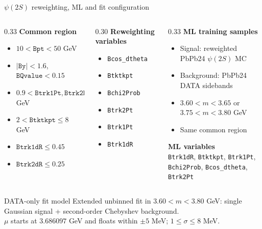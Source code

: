 \documentclass[11pt,aspectratio=169]{beamer}
\begin{document}
\begin{frame}[label=p4]{$\psi(2S)$ reweighting, ML and fit configuration}
  \footnotesize
  \begin{columns}[T,onlytextwidth]
    \begin{column}{0.33\textwidth}
      \textbf{Common region}
      \begin{itemize}
        \setlength{\itemsep}{0.08em}
        \item $10<\texttt{Bpt}<50$ GeV
        \item $|\texttt{By}|<1.6$, $\texttt{BQvalue}<0.15$
        \item $0.9<\texttt{Btrk1Pt},\texttt{Btrk2Pt}\leq4.5$ GeV
        \item $2<\texttt{Btktkpt}\leq8$ GeV
        \item $\texttt{Btrk1dR}\leq0.45$
        \item $\texttt{Btrk2dR}\leq0.25$
      \end{itemize}
    \end{column}
    \begin{column}{0.30\textwidth}
      \textbf{Reweighting variables}
      \begin{itemize}
        \setlength{\itemsep}{0.08em}
        \item \texttt{Bcos\_dtheta}
        \item \texttt{Btktkpt}
        \item \texttt{Bchi2Prob}
        \item \texttt{Btrk2Pt}
        \item \texttt{Btrk1Pt}
        \item \texttt{Btrk1dR}
      \end{itemize}
    \end{column}
    \begin{column}{0.33\textwidth}
      \textbf{ML training samples}
      \begin{itemize}
        \setlength{\itemsep}{0.08em}
        \item Signal: reweighted PbPb24 $\psi(2S)$ MC
        \item Background: PbPb24 DATA sidebands
        \item $3.60<m<3.65$ or $3.75<m<3.80$ GeV
        \item Same common region
      \end{itemize}
      \textbf{ML variables}\\[0.10em]
      \texttt{Btrk1dR}, \texttt{Btktkpt}, \texttt{Btrk1Pt},\\
      \texttt{Bchi2Prob}, \texttt{Bcos\_dtheta}, \texttt{Btrk2Pt}
    \end{column}
  \end{columns}

  \vspace{0.35em}
  \begin{block}{DATA-only fit model}
    \centering
    Extended unbinned fit in $3.60<m<3.80$ GeV: single Gaussian signal + second-order Chebyshev background.\\[0.20em]
    $\mu$ starts at $3.686097$ GeV and floats within $\pm5$ MeV;
    $1\leq\sigma\leq8$ MeV.
  \end{block}
\end{frame}
\end{document}

